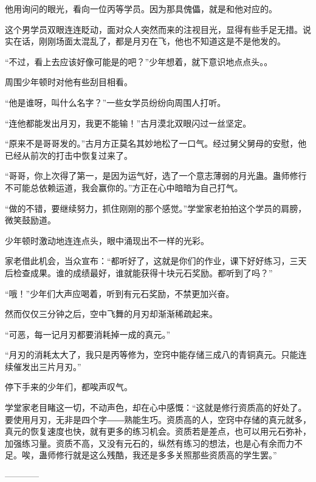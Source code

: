 \begin{this_body}
他用询问的眼光，看向一位丙等学员。因为那具傀儡，就是和他对应的。

这个男学员双眼连连眨动，面对众人突然而来的注视目光，显得有些手足无措。说实在话，刚刚场面太混乱了，都是月刃在飞，他也不知道这是不是他发的。

“不过，看上去应该好像可能是的吧？”少年想着，就下意识地点点头。。

周围少年顿时对他有些刮目相看。

“他是谁呀，叫什么名字？”一些女学员纷纷向周围人打听。

“连他都能发出月刃，我更不能输！”古月漠北双眼闪过一丝坚定。

“原来不是哥哥发的。”古月方正莫名其妙地松了一口气。经过舅父舅母的安慰，他已经从前次的打击中恢复过来了。

“哥哥，你上次得了第一，是因为运气好，选了一个意志薄弱的月光蛊。蛊师修行不可能总依赖运道，我会赢你的。”方正在心中暗暗为自己打气。

“做的不错，要继续努力，抓住刚刚的那个感觉。”学堂家老拍拍这个学员的肩膀，微笑鼓励道。

少年顿时激动地连连点头，眼中涌现出不一样的光彩。

家老借此机会，当众宣布：“都听好了，这就是你们的作业，课下好好练习，三天后检查成果。谁的成绩最好，谁就能获得十块元石奖励。都听到了吗？”

“哦！”少年们大声应喝着，听到有元石奖励，不禁更加兴奋。

然而仅仅三分钟之后，空中飞舞的月刃却渐渐稀疏起来。

“可恶，每一记月刃都要消耗掉一成的真元。”

“月刃的消耗太大了，我只是丙等修为，空窍中能存储三成八的青铜真元。只能连续催发出三片月刃。”

停下手来的少年们，都唉声叹气。

学堂家老目睹这一切，不动声色，却在心中感慨：“这就是修行资质高的好处了。要使用月刃，无非是四个字――熟能生巧。资质高的人，空窍中存储的真元就多，真元的恢复速度也快，就有更多的练习机会。资质若是差点，也可以用元石弥补，加强练习量。资质不高，又没有元石的，纵然有练习的想法，也是心有余而力不足。唉，蛊师修行就是这么残酷，我还是多多关照那些资质高的学生罢。”

------------

\end{this_body}

